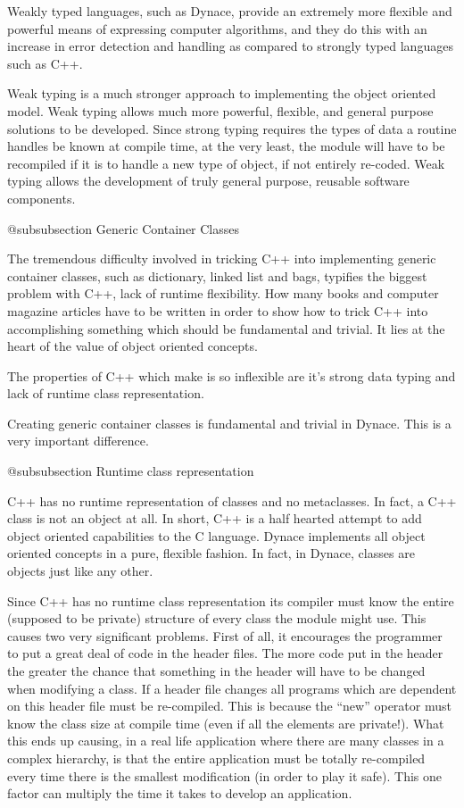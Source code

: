 Weakly typed languages, such as Dynace, provide an extremely more
flexible and powerful means of expressing computer algorithms, and
they do this with an increase in error detection and handling as
compared to strongly typed languages such as C++.

Weak typing is a much stronger approach to implementing the object
oriented model.  Weak typing allows much more powerful, flexible, and
general purpose solutions to be developed.  Since strong typing
requires the types of data a routine handles be known at compile time,
at the very least, the module will have to be recompiled if it is to
handle a new type of object, if not entirely re-coded.  Weak typing
allows the development of truly general purpose, reusable software
components.

@subsubsection Generic Container Classes

The tremendous difficulty involved in tricking C++ into implementing
generic container classes, such as dictionary, linked list and bags,
typifies the biggest problem with C++, lack of runtime flexibility.
How many books and computer magazine articles have to be written
in order to show how to trick C++ into accomplishing something
which should be fundamental and trivial.  It lies at the heart of
the value of object oriented concepts.

The properties of C++ which make is so inflexible are it's strong data
typing and lack of runtime class representation.

Creating generic container classes is fundamental and trivial in Dynace.
This is a very important difference.

@subsubsection Runtime class representation

C++ has no runtime representation of classes and no metaclasses.  In
fact, a C++ class is not an object at all.  In short, C++ is a half
hearted attempt to add object oriented capabilities to the C language.
Dynace implements all object oriented concepts in a pure, flexible fashion.
In fact, in Dynace, classes are objects just like any other.

Since C++ has no runtime class representation its compiler must know
the entire (supposed to be private) structure of every class the module
might use.  This causes two very significant problems.  First of all,
it encourages the programmer to put a great deal of code in the header
files.  The more code put in the header the greater the chance that
something in the header will have to be changed when modifying a class.
If a header file changes all programs which are dependent on this
header file must be re-compiled.  This is because the ``new'' operator
must know the class size at compile time (even if all the elements are
private!).  What this ends up causing, in a real life application
where there are many classes in a complex hierarchy, is that the
entire application must be totally re-compiled every time there is the
smallest modification (in order to play it safe).  This one factor can
multiply the time it takes to develop an application.

